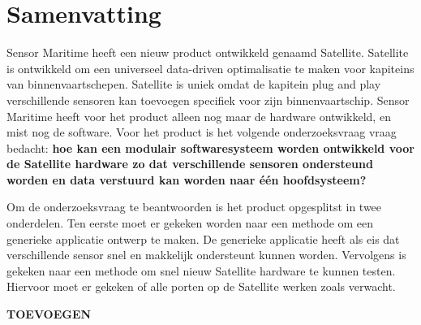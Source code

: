 \chapter*{Samenvatting}
Sensor Maritime heeft een nieuw product ontwikkeld genaamd Satellite. Satellite is ontwikkeld om een universeel data-driven optimalisatie te maken voor kapiteins van binnenvaartschepen. Satellite is uniek omdat de kapitein plug and play verschillende sensoren kan toevoegen specifiek voor zijn binnenvaartschip. Sensor Maritime heeft voor het product alleen nog maar de hardware ontwikkeld, en mist nog de software. Voor het product is het volgende onderzoeksvraag vraag bedacht: \textbf{hoe kan een modulair softwaresysteem worden ontwikkeld voor de Satellite hardware zo dat verschillende sensoren ondersteund worden en data verstuurd kan worden naar één hoofdsysteem?} \newline

\noindent Om de onderzoeksvraag te beantwoorden is het product opgesplitst in twee onderdelen. Ten eerste moet er gekeken worden naar een methode om een generieke applicatie ontwerp te maken. De generieke applicatie heeft als eis dat verschillende sensor snel en makkelijk ondersteunt kunnen worden. Vervolgens is gekeken naar een methode om snel nieuw Satellite hardware te kunnen testen. Hiervoor moet er gekeken of alle porten op de Satellite werken zoals verwacht.

{\color{red} \textbf{TOEVOEGEN}}
